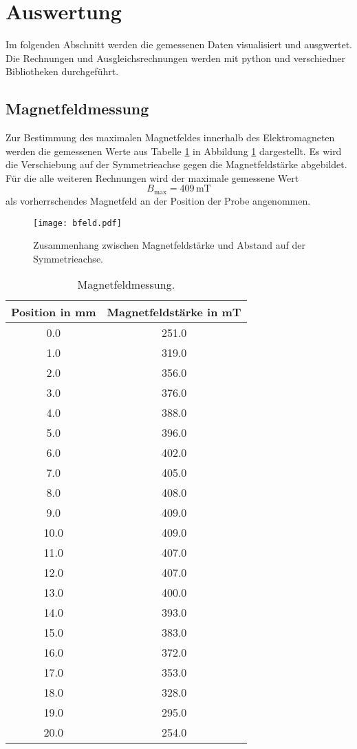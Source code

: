 \section{Auswertung}
\label{sec:Auswertung}

Im folgenden Abschnitt werden die gemessenen Daten visualisiert und ausgwertet.
Die Rechnungen und Ausgleichsrechnungen werden mit python und verschiedner Bibliotheken durchgeführt.

\subsection{Magnetfeldmessung}
\label{sec:magFeld}

Zur Bestimmung des maximalen Magnetfeldes innerhalb des Elektromagneten werden die gemessenen Werte aus Tabelle \ref{tab:magFeld} in Abbildung \ref{abb:magFeld} dargestellt.
Es wird die Verschiebung auf der Symmetrieachse gegen die Magnetfeldstärke abgebildet.
Für die alle weiteren Rechnungen wird der maximale gemessene Wert
\begin{equation}
  B_{\text{max}}=409\,\text{mT}
\end{equation}
als vorherrschendes Magnetfeld an der Position der Probe angenommen.
\begin{figure}
  \centering
  \texttt{[image: bfeld.pdf]}
  \caption{Zusammenhang zwischen Magnetfeldstärke und Abstand auf der Symmetrieachse.}
  \label{abb:magFeld}
\end{figure}
\FloatBarrier

\begin{table}
  \centering
  \caption{Magnetfeldmessung.}
  \label{tab:magFeld}
  \begin{tabular}{c | c}
    \toprule
    Position in mm & Magnetfeldstärke in mT \\
    \midrule
    0.0 & 251.0 \\
    1.0 & 319.0 \\
    2.0 & 356.0 \\
    3.0 & 376.0 \\
    4.0 & 388.0 \\
    5.0 & 396.0 \\
    6.0 & 402.0 \\
    7.0 & 405.0 \\
    8.0 & 408.0 \\
    9.0 & 409.0 \\
    10.0 & 409.0 \\
    11.0 & 407.0 \\
    12.0 & 407.0 \\
    13.0 & 400.0 \\
    14.0 & 393.0 \\
    15.0 & 383.0 \\
    16.0 & 372.0 \\
    17.0 & 353.0 \\
    18.0 & 328.0 \\
    19.0 & 295.0 \\
    20.0 & 254.0 \\
    \bottomrule
  \end{tabular}
\end{table}
\FloatBarrier

